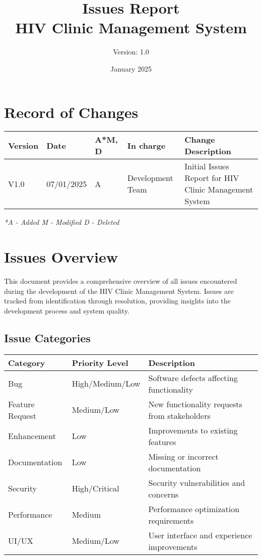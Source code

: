 \documentclass[12pt,a4paper]{article}
\title{\textbf{Issues Report\\HIV Clinic Management System}}
\author{Version: 1.0}
\date{January 2025}
\begin{document}
\maketitle
\thispagestyle{empty}

\newpage

\section*{Record of Changes}

\begin{longtable}{|p{1.5cm}|p{1.8cm}|p{1cm}|p{2.5cm}|p{5.5cm}|}
\hline
\textbf{Version} & \textbf{Date} & \textbf{A*M, D} & \textbf{In charge} & \textbf{Change Description} \\
\hline
V1.0 & 07/01/2025 & A & Development Team & Initial Issues Report for HIV Clinic Management System \\
\hline
\end{longtable}

\textit{*A - Added M - Modified D - Deleted}

\newpage

\tableofcontents

\newpage

\section{Issues Overview}

This document provides a comprehensive overview of all issues encountered during the development of the HIV Clinic Management System. Issues are tracked from identification through resolution, providing insights into the development process and system quality.

\subsection{Issue Categories}

\begin{longtable}{|p{2.5cm}|p{2.5cm}|p{7.5cm}|}
\hline
\textbf{Category} & \textbf{Priority Level} & \textbf{Description} \\
\hline
Bug & High/Medium/Low & Software defects affecting functionality \\
\hline
Feature Request & Medium/Low & New functionality requests from stakeholders \\
\hline
Enhancement & Low & Improvements to existing features \\
\hline
Documentation & Low & Missing or incorrect documentation \\
\hline
Security & High/Critical & Security vulnerabilities and concerns \\
\hline
Performance & Medium & Performance optimization requirements \\
\hline
UI/UX & Medium/Low & User interface and experience improvements \\
\hline
\end{longtable}
\end{document}
